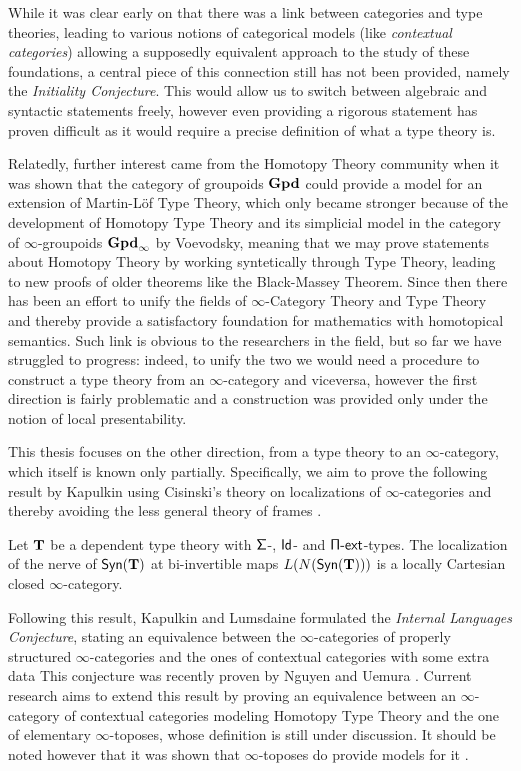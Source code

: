 \noindent
While it was clear early on that there was a link between categories and type
theories, leading to various notions of categorical models (like
\emph{contextual categories}) allowing a supposedly
equivalent approach to the study of these foundations, a central piece of this
connection still has not been provided, namely the \emph{Initiality Conjecture}.
This would allow us to switch between algebraic and syntactic statements freely,
however even providing a rigorous statement has proven difficult as it would
require a precise definition of what a type theory is.

\noindent
Relatedly, further interest came from the Homotopy Theory community when it was
shown that the category of groupoids $\operatorname{\mathbf{Gpd}}$ could provide a model for an
extension of Martin-L{\"o}f Type Theory, which only became stronger because of
the development of
Homotopy Type Theory and its simplicial model in the category of
$\infty$-groupoids $\operatorname{\mathbf{Gpd}_\infty}$ by
Voevodsky, meaning that we may prove statements about Homotopy Theory by working
syntetically through Type Theory, leading to new proofs of older theorems like
the Black-Massey Theorem. Since then there has been an effort to unify the
fields of $\infty$-Category Theory and Type Theory and thereby provide a
satisfactory foundation for mathematics with homotopical semantics. Such link is
obvious to the researchers in the field, but so far we have struggled to
progress: indeed, to unify the two we would need a procedure to construct a type
theory from an $\infty$-category and viceversa, however the first direction is
fairly problematic and a construction was provided only under the notion of
local presentability.

\noindent
This thesis focuses on the other direction, from a type theory to an
$\infty$-category, which itself is known only partially. Specifically, we aim to
prove the following result by Kapulkin \cite[Thm.\ 9.3.17]{Kap14} using
Cisinski's theory on localizations of $\infty$-categories \cite{Cis19} and
thereby avoiding the less general theory of frames \cite{Szu14,KS15}.

\begin{finalthm}
  Let $\operatorname{\mathbf{T}}$ be a dependent type theory with $\operatorname{\mathsf{\Sigma}}$-, $\operatorname{\mathsf{Id}}$- and
  $\operatorname{\mathsf{\Pi-ext}}$-types. The localization of the nerve of $\mathsf{Syn}(\mathbf{T})$ at bi-invertible
  maps $L(N(\mathsf{Syn}(\mathbf{T})))$ is a locally Cartesian closed $\infty$-category.
\end{finalthm}

\noindent
Following this result, Kapulkin and Lumsdaine formulated the \emph{Internal
Languages Conjecture}, stating an equivalence between the
$\infty$-categories of properly structured $\infty$-categories and the ones of
contextual categories with some extra data
This conjecture
was recently proven by Nguyen and Uemura \cite{NU22}. Current research aims to
extend this result by proving an equivalence between an $\infty$-category of
contextual categories modeling Homotopy Type Theory and the one of elementary
$\infty$-toposes, whose definition is still under discussion. It should be noted
however that it was shown that $\infty$-toposes do provide models for it
\cite{Shu19}.

